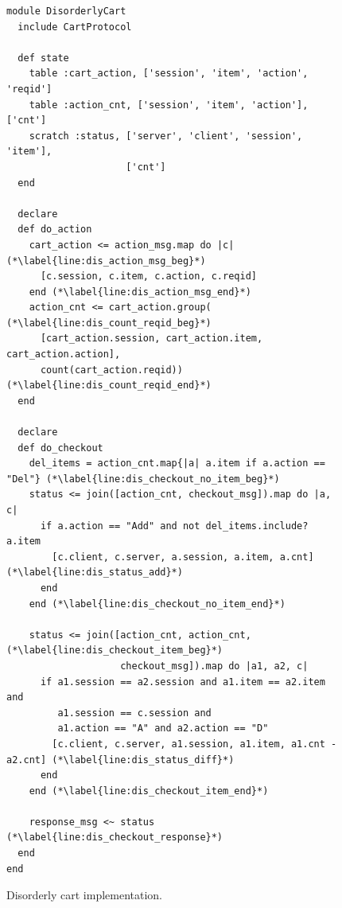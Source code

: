 \begin{figure}[t]
\begin{scriptsize}
\begin{lstlisting}
module DisorderlyCart
  include CartProtocol

  def state
    table :cart_action, ['session', 'item', 'action', 'reqid']
    table :action_cnt, ['session', 'item', 'action'], ['cnt']
    scratch :status, ['server', 'client', 'session', 'item'],
                     ['cnt']
  end

  declare
  def do_action
    cart_action <= action_msg.map do |c|  (*\label{line:dis_action_msg_beg}*)
      [c.session, c.item, c.action, c.reqid] 
    end (*\label{line:dis_action_msg_end}*)
    action_cnt <= cart_action.group(  (*\label{line:dis_count_reqid_beg}*)
      [cart_action.session, cart_action.item, cart_action.action],
      count(cart_action.reqid))  (*\label{line:dis_count_reqid_end}*)
  end

  declare
  def do_checkout
    del_items = action_cnt.map{|a| a.item if a.action == "Del"} (*\label{line:dis_checkout_no_item_beg}*)
    status <= join([action_cnt, checkout_msg]).map do |a, c|
      if a.action == "Add" and not del_items.include? a.item
        [c.client, c.server, a.session, a.item, a.cnt] (*\label{line:dis_status_add}*)
      end
    end (*\label{line:dis_checkout_no_item_end}*)

    status <= join([action_cnt, action_cnt, (*\label{line:dis_checkout_item_beg}*)
                    checkout_msg]).map do |a1, a2, c|
      if a1.session == a2.session and a1.item == a2.item and
         a1.session == c.session and
         a1.action == "A" and a2.action == "D"
        [c.client, c.server, a1.session, a1.item, a1.cnt - a2.cnt] (*\label{line:dis_status_diff}*)
      end
    end (*\label{line:dis_checkout_item_end}*)

    response_msg <~ status (*\label{line:dis_checkout_response}*)
  end
end
\end{lstlisting}
\vspace{-10pt}
\caption{Disorderly cart implementation.}
\label{fig:dis-cart}
\end{scriptsize}
\vspace{-2pt}
\end{figure}


